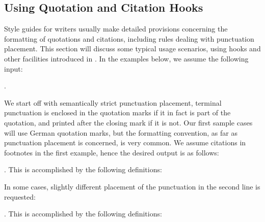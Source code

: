 \documentclass{ltxdockit}[2010/09/26]
\makeatletter
\newcounter{@pseudofootnote}
\newcommand{\@pseudofootnote}[1]{%
  \stepcounter{@pseudofootnote}%
  \textsuperscript{\number\value{@pseudofootnote}}}
\newenvironment{quotesample}[2][]
  {\setquotestyle[#1]{#2}%
   \setcounter{@pseudofootnote}{0}%
   \let\footnote\@pseudofootnote
   \trivlist
   \leftskip\parindent
   \small}
  {\endtrivlist}
\makeatother
\begin{document}
\subsection{Using Quotation and Citation Hooks}
\label{use:hok}

Style guides for writers usually make detailed provisions concerning the formatting of quotations and citations, including rules dealing with punctuation placement. This section will discuss some typical usage scenarios, using hooks and other facilities introduced in . In the examples below, we assume the following input:

\begin{ltxcode}
.
\end{ltxcode}
%
We start off with semantically strict punctuation placement, \ie terminal punctuation is enclosed in the quotation marks if it in fact is part of the quotation, and printed after the closing mark if it is not. Our first sample cases will use German quotation marks, but the formatting convention, as far as punctuation placement is concerned, is very common. We assume citations in footnotes in the first example, hence the desired output is as follows:

\begin{quotesample}{german}
\renewcommand{\mkcitation}[1]{\footnote{#1}}
\renewcommand{\mktextquote}[6]{#1#2#4#3#5#6}

\item {}
\item {}.
\end{quotesample}
%
This is accomplished by the following definitions:

\begin{ltxcode}
\renewcommand{\mkcitation}[1]{\footnote{#1}}
\renewcommand{\mktextquote}[6]{#1#2#4#3#5#6}
\end{ltxcode}
%
In some cases, slightly different placement of the punctuation in the second line is requested:

\begin{quotesample}{german}
\renewcommand{\mkcitation}[1]{\footnote{#1}}
\renewcommand{\mktextquote}[6]{#1#2#4#3#6#5}

\item {}
\item {}.
\end{quotesample}
%
This is accomplished by the following definitions:
\end{document}
